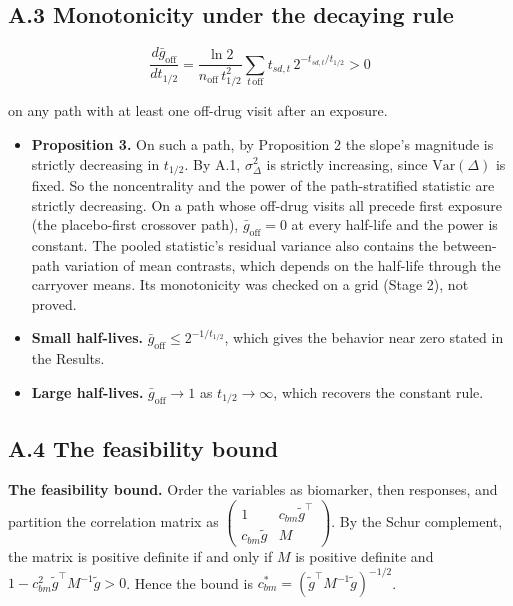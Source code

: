 \documentclass[
  11pt,
]{article}
\providecommand{\tightlist}{%
  \setlength{\itemsep}{0pt}\setlength{\parskip}{0pt}}
\begin{document}
\subsection*{A.3 Monotonicity under the decaying rule}\label{a.3-monotonicity-under-the-decaying-rule}

\[\frac{d\bar g_{\text{off}}}{dt_{1/2}}
  = \frac{\ln 2}{n_{\text{off}}\,t_{1/2}^2}
    \sum_{t\,\text{off}} t_{sd,t}\,2^{-t_{sd,t}/t_{1/2}} > 0\]

on any path with at least one off-drug visit after an exposure.

\begin{itemize}
\tightlist
\item
  \textbf{Proposition 3.} On such a path, by Proposition 2 the slope's
  magnitude is strictly decreasing in \(t_{1/2}\). By A.1,
  \(\sigma_\Delta^2\) is strictly increasing, since \(\mathrm{Var}(\Delta)\)
  is fixed. So the noncentrality and the power of the path-stratified
  statistic are strictly decreasing. On a path whose off-drug visits
  all precede first exposure (the placebo-first crossover path),
  \(\bar g_{\text{off}} = 0\) at every half-life and the power is constant.
  The pooled statistic's residual variance also contains the
  between-path variation of mean contrasts, which depends on the
  half-life through the carryover means. Its monotonicity was checked
  on a grid (Stage 2), not proved.
\item
  \textbf{Small half-lives.} \(\bar g_{\text{off}} \le 2^{-1/t_{1/2}}\), which
  gives the behavior near zero stated in the Results.
\item
  \textbf{Large half-lives.} \(\bar g_{\text{off}} \to 1\) as
  \(t_{1/2} \to \infty\), which recovers the constant rule.
\end{itemize}

\subsection*{A.4 The feasibility bound}\label{a.4-the-feasibility-bound}

\textbf{The feasibility bound.} Order the variables as biomarker, then
responses, and partition the correlation matrix as
\(\begin{pmatrix} 1 & c_{bm}\tilde g^\top \\ c_{bm}\tilde g & M\end{pmatrix}\).
By the Schur complement, the matrix is positive definite if and only if
\(M\) is positive definite and \(1 - c_{bm}^2 \tilde g^\top M^{-1}\tilde g > 0\).
Hence the bound is \(c_{bm}^* = (\tilde g^\top M^{-1}\tilde g)^{-1/2}\).
\end{document}

